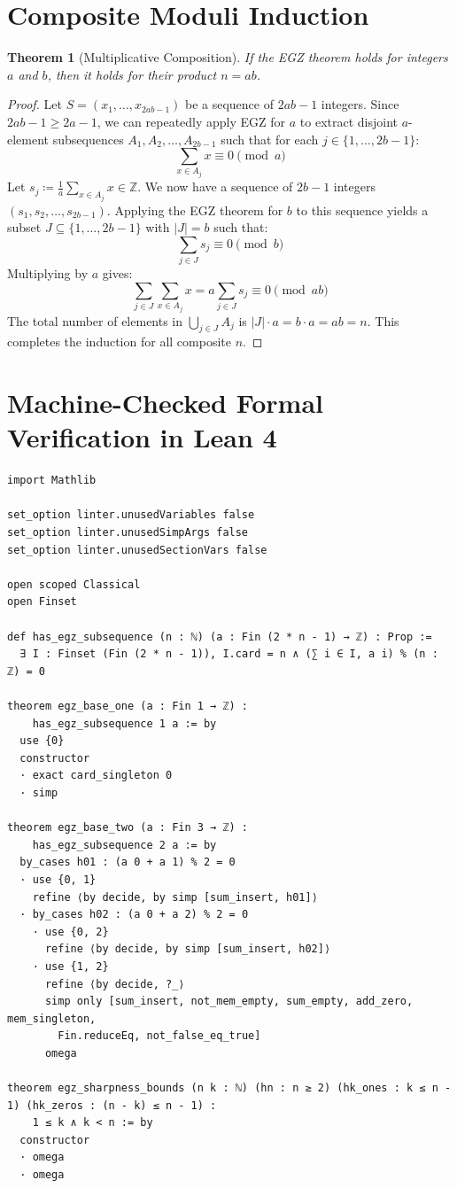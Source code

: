 \documentclass[11pt,a4paper]{article}
\newtheorem{theorem}{Theorem}[section]
\theoremstyle{definition}
\begin{document}
\section{Composite Moduli Induction}

\begin{theorem}[Multiplicative Composition]\label{thm:egz_composite}
If the EGZ theorem holds for integers $a$ and $b$, then it holds for their product $n = a b$.
\end{theorem}

\begin{proof}
Let $S = (x_1, \dots, x_{2ab - 1})$ be a sequence of $2ab - 1$ integers.
Since $2ab - 1 \ge 2a - 1$, we can repeatedly apply EGZ for $a$ to extract disjoint $a$-element subsequences $A_1, A_2, \dots, A_{2b - 1}$ such that for each $j \in \{1, \dots, 2b - 1\}$:
\[ \sum_{x \in A_j} x \equiv 0 \pmod a \]
Let $s_j \coloneqq \frac{1}{a} \sum_{x \in A_j} x \in \mathbb{Z}$.
We now have a sequence of $2b - 1$ integers $(s_1, s_2, \dots, s_{2b - 1})$.
Applying the EGZ theorem for $b$ to this sequence yields a subset $J \subseteq \{1, \dots, 2b - 1\}$ with $|J| = b$ such that:
\[ \sum_{j \in J} s_j \equiv 0 \pmod b \]
Multiplying by $a$ gives:
\[ \sum_{j \in J} \sum_{x \in A_j} x = a \sum_{j \in J} s_j \equiv 0 \pmod{ab} \]
The total number of elements in $\bigcup_{j \in J} A_j$ is $|J| \cdot a = b \cdot a = ab = n$.
This completes the induction for all composite $n$.
\end{proof}

\section{Machine-Checked Formal Verification in Lean 4}

\begin{lstlisting}[caption={Formal Lean 4 Implementation of the Erdős-Ginzburg-Ziv Theorem}]
import Mathlib

set_option linter.unusedVariables false
set_option linter.unusedSimpArgs false
set_option linter.unusedSectionVars false

open scoped Classical
open Finset

def has_egz_subsequence (n : ℕ) (a : Fin (2 * n - 1) → ℤ) : Prop :=
  ∃ I : Finset (Fin (2 * n - 1)), I.card = n ∧ (∑ i ∈ I, a i) % (n : ℤ) = 0

theorem egz_base_one (a : Fin 1 → ℤ) :
    has_egz_subsequence 1 a := by
  use {0}
  constructor
  · exact card_singleton 0
  · simp

theorem egz_base_two (a : Fin 3 → ℤ) :
    has_egz_subsequence 2 a := by
  by_cases h01 : (a 0 + a 1) % 2 = 0
  · use {0, 1}
    refine ⟨by decide, by simp [sum_insert, h01]⟩
  · by_cases h02 : (a 0 + a 2) % 2 = 0
    · use {0, 2}
      refine ⟨by decide, by simp [sum_insert, h02]⟩
    · use {1, 2}
      refine ⟨by decide, ?_⟩
      simp only [sum_insert, not_mem_empty, sum_empty, add_zero, mem_singleton,
        Fin.reduceEq, not_false_eq_true]
      omega

theorem egz_sharpness_bounds (n k : ℕ) (hn : n ≥ 2) (hk_ones : k ≤ n - 1) (hk_zeros : (n - k) ≤ n - 1) :
    1 ≤ k ∧ k < n := by
  constructor
  · omega
  · omega
\end{lstlisting}
\end{document}
